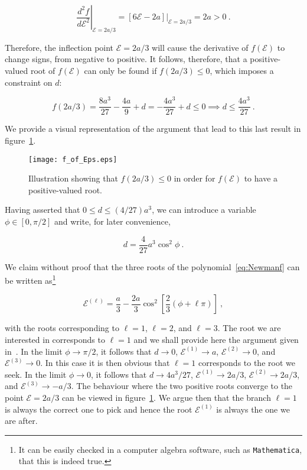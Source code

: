 \documentclass{article}
\newcommand{\Eps}{\mathcal{E}}
\newcommand{\eq}[1]{
\begin{equation}
    #1
\end{equation}
}
\begin{document}
\eq{
  \left.\frac{d^{2}f}{d\Eps^{2}}\right|_{\Eps=2a/3} = \left.\left[6\Eps - 2a\right]\right|_{\Eps=2a/3} = 2a > 0\ .
}

\noindent Therefore, the inflection point $\Eps=2a/3$ will cause the derivative of $f(\Eps)$ to change signs, from negative to positive. It follows, therefore, that a positive-valued root of $f(\Eps)$ can only be found if $f(2a/3)\leq0$, which imposes a constraint on $d$:

\eq{
  f\left(2a/3\right) = \frac{8a^{3}}{27} - \frac{4a}{9} + d = - \frac{4a^{3}}{27} + d \leq 0 \implies d \leq \frac{4a^{3}}{27}\ .
}

\noindent We provide a visual representation of the argument that lead to this last result in figure~\ref{fig:f_of_Eps}.

\begin{figure}[!htb]
    \centering
    \texttt{[image: f\_of\_Eps.eps]}
    \caption{Illustration showing that $f(2a/3)\leq0$ in order for $f(\Eps)$ to have a positive-valued root.}
    \label{fig:f_of_Eps}
\end{figure}

Having asserted that $0\leq d \leq (4/27)a^{3}$, we can introduce a variable $\phi\in[0,\pi/2]$ and write, for later convenience,

\eq{
  d = \frac{4}{27}a^{3}\cos^{2}\phi\ .
}

\noindent We claim without proof that the three roots of the polynomial~\eqref{eq:Newmanf} can be written as\footnote{It can be easily checked in a computer algebra software, such as {\tt Mathematica}, that this is indeed true.}

\eq{
  \Eps^{(\ell)} = \frac{a}{3} - \frac{2a}{3}\cos^{2}\left[\frac{2}{3}\left(\phi+\ell\pi\right)\right]\ ,
}

\noindent with the roots corresponding to $\ell=1$, $\ell=2$, and $\ell=3$. The root we are interested in corresponds to $\ell=1$ and we shall provide here the argument given in~\cite{newman2014primitive}. In the limit $\phi\to\pi/2$, it follows that $d\to0$, $\Eps^{(1)}\to a$, $\Eps^{(2)}\to 0$, and $\Eps^{(3)}\to 0$. In this case it is then obvious that $\ell=1$ corresponds to the root we seek. In the limit $\phi\to0$, it follows that $d\to4a^{3}/27$, $\Eps^{(1)}\to2a/3$, $\Eps^{(2)}\to2a/3$, and $\Eps^{(3)}\to -a/3$. The behaviour where the two positive roots converge to the point $\Eps=2a/3$ can be viewed in figure~\ref{fig:f_of_Eps}. We argue then that the branch $\ell=1$ is always the correct one to pick and hence the root $\Eps^{(1)}$ is always the one we are after.
\end{document}
